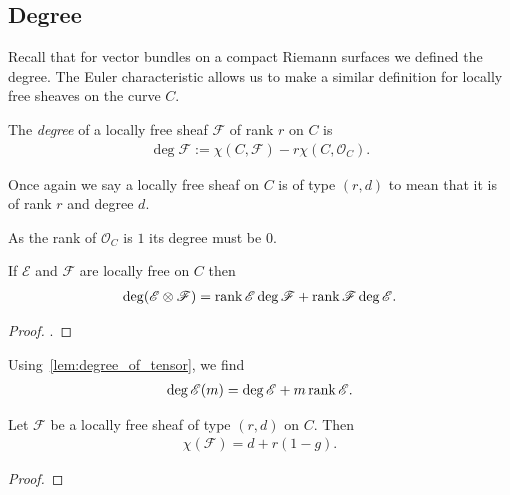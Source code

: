 \documentclass[12pt]{ociamthesis}  %
\begin{document}
\subsection{Degree}

Recall that for vector bundles on a compact Riemann surfaces we defined the
degree.  The Euler characteristic allows us to make a similar definition for
locally free sheaves on the curve $C$.

\begin{definition}
  The \emph{degree} of a locally free sheaf $\mathscr F$ of rank $r$
  on $C$ is
  \begin{align*}
    \deg \mathscr F := \chi (C,\mathscr F) - r\chi(C,\mathscr O_C).
  \end{align*}
\end{definition}

Once again we say a locally free sheaf on $C$ is of
type $(r,d)$ to mean that it is of rank $r$ and degree $d$.

\begin{example}
  As the rank of $\mathscr O_C$ is $1$ its degree must be $0$.
\end{example}

\begin{lemma}\label{lem:degree_of_tensor}
  If $\mathscr E$ and $\mathscr F$ are locally free on $C$ then
  \begin{align*}
    \deg(\mathscr E\otimes\mathscr F) = \operatorname{rank}\mathscr E\deg\mathscr F + \operatorname{rank}\mathscr F\deg\mathscr E.
  \end{align*}
  \begin{proof}
    \cite[Exercise 8.24]{hoskins2016}.
    \missingproof
  \end{proof}
\end{lemma}

\begin{example}
  Using~\ref{lem:degree_of_tensor}, we find 
  \begin{align*}
    \deg \mathscr E(m) = \deg\mathscr E + m\operatorname{rank}\mathscr E.
  \end{align*}
\end{example}

\begin{theorem}\label{thm:riemann_roch}
  Let $\mathscr F$ be a locally free sheaf of type $(r,d)$
  on $C$. Then
  \begin{align*}
    \chi(\mathscr F) = d + r(1-g).
  \end{align*}
  \begin{proof}
    \missingproof
  \end{proof}
\end{theorem}
\end{document}
